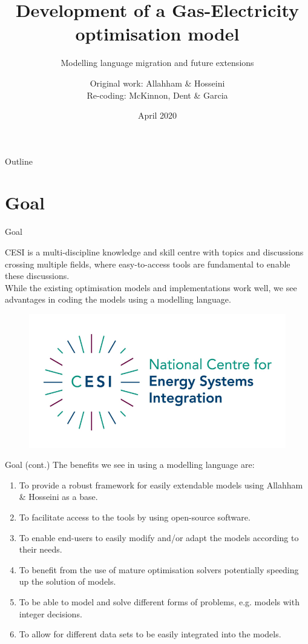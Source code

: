 \documentclass[handout]{beamer}
\title[Development of a Coordinated Gas-Electricity optimisation model]{\normalsize{Development of a Gas-Electricity optimisation model}}
\subtitle{\small{Modelling language migration and future extensions}}
\author{\texorpdfstring{Original work: }{}Allahham \& Hosseini \texorpdfstring{\\Re-coding: }{}McKinnon, Dent \& Garcia}
\institute{National Centre for Energy System Integration (CESI)}
\date{April 2020}
\begin{document}
\begin{frame}
  \titlepage
\end{frame}

\begin{frame}{Outline}
  \tableofcontents
\end{frame}

\section{Goal}

\begin{frame}[t]{Goal}

  CESI is a multi-discipline knowledge and skill centre with topics and discussions crossing multiple fields, where easy-to-access tools are fundamental to enable these discussions.\\[12pt]

  While the existing optimisation models and implementations work well, we see advantages in coding the models using a modelling language.

  \begin{figure}
  \begin{center}
  \includegraphics[width=.60\textwidth]{CESI.png}
  \end{center}
  \end{figure}

\end{frame}


\begin{frame}[t]{Goal (cont.)}
  \vspace{0.5cm}
  The benefits we see in using a modelling language are:\\[12pt]

  \begin{enumerate}
    \item To provide a robust framework for easily extendable models using Allahham \& Hosseini as a base.
    \item To facilitate access to the tools by using open-source software.
    \item To enable end-users to easily modify and/or adapt the models according to their needs.
    \item To benefit from the use of mature optimisation solvers potentially speeding up the solution of models.
    \item To be able to model and solve different forms of problems, e.g. models with integer decisions.
    \item To allow for different data sets to be easily integrated into the models.
  \end{enumerate}

\end{frame}
\end{document}
